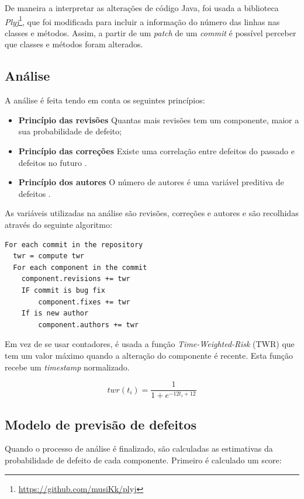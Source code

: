 \documentclass[9pt,a4paper]{extarticle}
\begin{document}
\begin{multicols}{2}
De maneira a interpretar as alterações de código Java, foi usada a biblioteca
\emph{Plyj}\footnote{\url{https://github.com/musiKk/plyj}}, que foi modificada
para incluir a informação do número das linhas nas classes e métodos. Assim,
a partir de um \emph{patch} de um \emph{commit} é possível perceber que classes e
métodos foram alterados.

\subsection{Análise}
A análise é feita tendo em conta os seguintes princípios:

\begin{itemize}
\item \textbf{Princípio das revisões} Quantas mais revisões tem um componente,
maior a sua probabilidade de defeito\cite{859533};

\item \textbf{Princípio das correções} Existe uma correlação entre defeitos do
passado e defeitos no futuro \cite{Zimmermann:2007:PDE:1268984.1269057}.

\item \textbf{Princípio dos autores} O número de autores é uma variável
preditiva de defeitos \cite{Moser:2008:CAE:1368088.1368114,D'Ambros:2012:EDP:2318097.2318149}.
\end{itemize}


As variáveis utilizadas na análise são revisões, correções e autores e são
recolhidas através do seguinte algoritmo:

\begin{verbatim}
For each commit in the repository
  twr = compute twr
  For each component in the commit
    component.revisions += twr
    IF commit is bug fix
        component.fixes += twr
    If is new author
        component.authors += twr
\end{verbatim}

Em vez de se usar contadores, é usada a função \emph{Time-Weighted-Risk} (TWR) que
tem um valor máximo quando a alteração do componente é recente. Esta função
recebe um \emph{timestamp} normalizado.

\begin{equation}
twr(t_i) = \frac{1}{1 + e^{-12t_i + 12 }}
\end{equation}

\subsection{Modelo de previsão de defeitos}
Quando o processo de análise é finalizado, são calculadas as estimativas da
probabilidade de defeito de cada componente. Primeiro é calculado um score:


\end{multicols}
\end{document}
